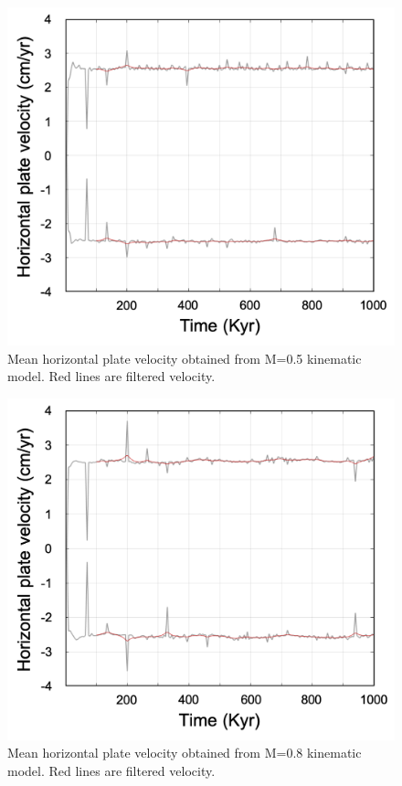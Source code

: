 \documentclass[letterpaper,12pt,notitle]{memphisthesis}                     %
\begin{document}
\begin{figure}[!htb]
	\centering
	\includegraphics[width=0.9\linewidth]{./figs/hmvkm05.png}
	\caption{Mean horizontal plate velocity obtained from M=0.5 kinematic model. Red lines are filtered velocity.}
	\label{fig:km05}
\end{figure}
\begin{figure}[!htb]
	\centering
	\includegraphics[width=0.9\linewidth]{./figs/hmvkm08.png}
	\caption{Mean horizontal plate velocity obtained from M=0.8 kinematic model. Red lines are filtered velocity.}
	\label{fig:km08}
\end{figure}
\end{document}
